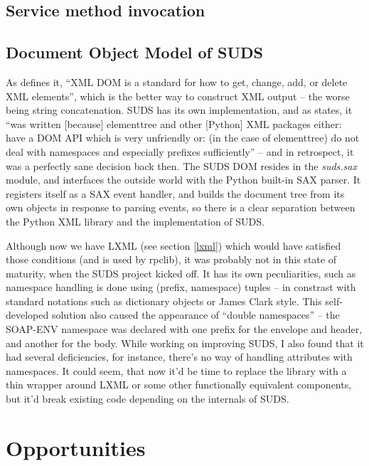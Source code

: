 \subsection{Service method invocation}
\label{sudsInvocation}


\subsection{Document Object Model of SUDS}

As \cite{w3schools-domintro} defines it, ``XML DOM is a standard for how to get, change, add, or delete XML elements'', which is the better way to construct XML output -- the worse being string concatenation. SUDS has its own implementation, and as \cite{suds-doc} states, it ``was written [because] elementtree and other [Python] XML packages either: have a DOM API which is very unfriendly or: (in the case of elementtree) do not deal with namespaces and especially prefixes sufficiently'' -- and in retrospect, it was a perfectly sane decision back then. The SUDS DOM resides in the \emph{suds.sax} module, and interfaces the outside world with the Python built-in SAX parser. It registers itself as a SAX event handler, and builds the document tree from its own objects in response to parsing events, so there is a clear separation between the Python XML library and the implementation of SUDS.

Although now we have LXML (see section \ref{lxml}) which would have satisfied those conditions (and is used by rpclib), it was probably not in this state of maturity, when the SUDS project kicked off. It has its own peculiarities, such as namespace handling is done using (prefix, namespace) tuples -- in constrast with standard notations such as dictionary objects or James Clark style. This self-developed solution also caused the appearance of ``double namespaces'' -- the SOAP-ENV namespace was declared with one prefix for the envelope and header, and another for the body. While working on improving SUDS, I also found that it had several deficiencies, for instance, there's no way of handling attributes with namespaces. It could seem, that now it'd be time to replace the library with a thin wrapper around LXML or some other functionally equivalent components, but it'd break existing code depending on the internals of SUDS.

\section{Opportunities}

